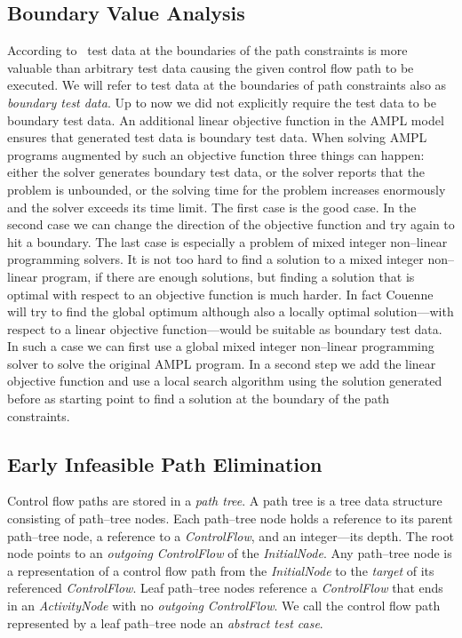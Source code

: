 \documentclass[runningheads,a4paper]{llncs}%
\newcommand{\UMLType}[1]{\textsf{\textit{#1}}} %
\newcommand{\UMLReference}[1]{\textsf{\textit{#1}}} %
\begin{document}
\subsection{Boundary Value Analysis}%
\label{sec:BoundaryValueAnalysis}%
According to~\cite{Kosmatov04BoundaryCoverageCrit} test data at the boundaries of
the path constraints is more valuable than arbitrary test data causing the given
control flow path to be executed. We will refer to test data at the boundaries
of path constraints also as \emph{boundary test data}. Up to now we did not
explicitly require the test data to be boundary test data. An additional linear
objective function in the AMPL model ensures that generated test data is
boundary test data. When solving AMPL programs augmented by such an objective
function three things can happen: either the solver generates boundary test
data, or the solver reports that the problem is unbounded, or the solving time
for the problem increases enormously and the solver exceeds its time limit.
The first case is the good case. In the second case we can change the direction
of the objective function and try again to hit a boundary. The last case is
especially a problem of mixed integer non--linear programming solvers. It is not
too hard to find a solution to a mixed integer non--linear program, if there are
enough solutions, but finding a solution that is optimal with respect to an
objective function is much harder. In fact Couenne will try to find the global
optimum although also a locally optimal solution---with respect to a linear
objective function---would be suitable as boundary test data. In such a case we
can first use a global mixed integer non--linear programming solver to solve the
original AMPL program. In a second step we add the linear objective function and
use a local search algorithm using the solution generated before as starting
point to find a solution at the boundary of the path constraints.
%
\subsection{Early Infeasible Path Elimination}%
\label{sec:InfeasiblePathElimination}%
Control flow paths are stored in a \emph{path tree}. A path tree is a tree data
structure consisting of path--tree nodes. Each path--tree node holds a reference
to its parent path--tree node, a reference to a \UMLType{ControlFlow}, and an
integer---its depth. The root node points to an \UMLReference{outgoing}
\UMLType{ControlFlow} of the \UMLType{InitialNode}. Any path--tree node is a
representation of a control flow path from the \UMLType{InitialNode} to the
\UMLReference{target} of its referenced \UMLType{ControlFlow}. Leaf path--tree
nodes reference a \UMLType{ControlFlow} that ends in an \UMLType{ActivityNode}
with no \UMLReference{outgoing} \UMLType{ControlFlow}. We call the control flow
path represented by a leaf path--tree node an \emph{abstract test case}.
\end{document}
